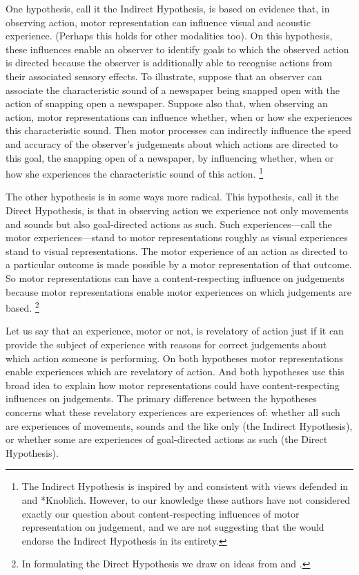 \documentclass[12pt,\papersize]{extarticle}
\begin{document}
One hypothesis, call it the Indirect Hypothesis, is based on evidence that, in observing action, motor representation can influence visual and acoustic experience.  (Perhaps this holds for other modalities too).  On this hypothesis, these influences enable an observer to identify goals to which the observed action is directed because the observer is additionally able to recognise actions from their associated sensory effects. To illustrate, suppose that an observer can associate the characteristic sound of a newspaper being snapped open with the action of snapping open a newspaper. Suppose also that, when observing an action, motor representations can influence whether, when or how she experiences this characteristic sound.  Then motor processes can indirectly influence the speed and accuracy of the observer's judgements about which actions are directed to this goal, the snapping open of a newspaper, by influencing whether, when or how she experiences the characteristic sound of this action.%
\footnote{
The Indirect Hypothesis is inspired by and consistent with views defended in \citet{Csibra:2007fy} and *Knoblich.  However, to our knowledge these authors have not considered exactly our question about content-respecting influences of motor representation on judgement, and we are not suggesting that the would endorse the Indirect Hypothesis in its entirety.  
}

The other hypothesis is in some ways more radical.  This hypothesis, call it the Direct Hypothesis, is that in observing action we experience not only movements and sounds but also goal-directed actions as such. Such experiences---call the motor experiences---stand to motor representations roughly as visual experiences stand to visual representations.  The motor experience of an action as directed to a particular outcome is made possible by a motor representation of that outcome.  So motor representations can have a content-respecting influence on judgements because motor representations enable motor experiences on which judgements are based.%
\footnote{
In formulating the Direct Hypothesis we draw on ideas from \citet{rizzolatti_mirrors_2008} and \citet{Jeannerod:1999kj}.
}

Let us say that an experience, motor or not, is revelatory of action just if it  can provide the subject of experience with reasons for correct judgements about which action someone is performing. On both hypotheses motor representations enable experiences which are revelatory of action. And both hypotheses use this broad idea to explain how motor representations could have content-respecting influences on judgements. The primary difference between the hypotheses concerns what these revelatory experiences are experiences of: whether all such are experiences of movements, sounds and the like only (the Indirect Hypothesis), or whether some are experiences of goal-directed actions as such (the Direct Hypothesis).  
\end{document}
